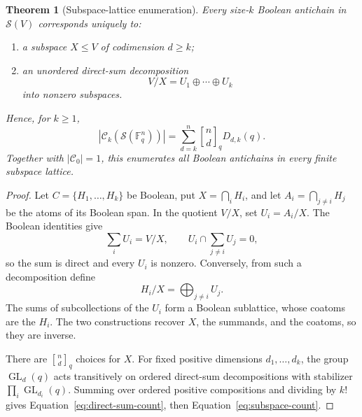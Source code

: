 \documentclass[11pt]{article}
\newtheorem{theorem}{Theorem}[section]
\theoremstyle{definition}
\theoremstyle{remark}
\newcommand{\cC}{\mathcal C}
\newcommand{\qbinom}[2]{\genfrac{[}{]}{0pt}{}{#1}{#2}_q}
\begin{document}
\begin{theorem}[Subspace-lattice enumeration]\label{thm:subspace}
Every size-$k$ Boolean antichain in $\mathcal S(V)$ corresponds uniquely to:

\begin{enumerate}
\item a subspace $X\le V$ of codimension $d\ge k$;
\item an unordered direct-sum decomposition
\[
 V/X=U_1\oplus\cdots\oplus U_k
\]
into nonzero subspaces.
\end{enumerate}

Hence, for $k\ge1$,
\begin{equation}\label{eq:subspace-count}
 \boxed{
 |\cC_k(\mathcal S(\mathbb F_q^n))|
 =\sum_{d=k}^n \qbinom{n}{d} D_{d,k}(q).}
\end{equation}
Together with $|\cC_0|=1$, this enumerates all Boolean antichains in every
finite subspace lattice.
\end{theorem}

\begin{proof}
Let $C=\{H_1,\ldots,H_k\}$ be Boolean, put $X=\bigcap_iH_i$, and let
$A_i=\bigcap_{j\ne i}H_j$ be the atoms of its Boolean span.  In the quotient
$V/X$, set $U_i=A_i/X$.  The Boolean identities give
\[
 \sum_iU_i=V/X,
 \qquad
 U_i\cap\sum_{j\ne i}U_j=0,
\]
so the sum is direct and every $U_i$ is nonzero.  Conversely, from such a
decomposition define
\[
 H_i/X=\bigoplus_{j\ne i}U_j.
\]
The sums of subcollections of the $U_i$ form a Boolean sublattice, whose
coatoms are the $H_i$.  The two constructions recover $X$, the summands, and
the coatoms, so they are inverse.

There are $\qbinom{n}{d}$ choices for $X$.  For fixed positive dimensions
$d_1,\ldots,d_k$, the group $\operatorname{GL}_d(q)$ acts transitively on
ordered direct-sum decompositions with stabilizer
$\prod_i\operatorname{GL}_{d_i}(q)$.  Summing over ordered positive
compositions and dividing by $k!$ gives Equation~\eqref{eq:direct-sum-count},
then Equation~\eqref{eq:subspace-count}.
\end{proof}
\end{document}
